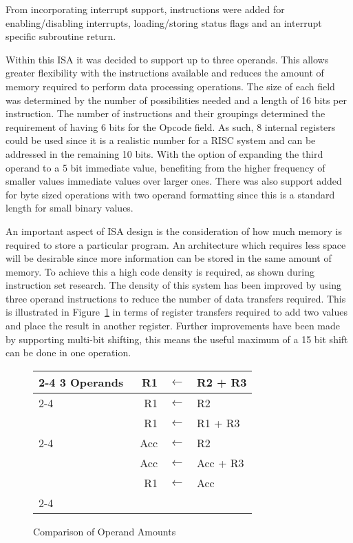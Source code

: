 From incorporating interrupt support, instructions were added for enabling/disabling interrupts, loading/storing status flags and an interrupt specific subroutine return.


Within this ISA it was decided to support up to three operands. 
This allows greater flexibility with the instructions available and reduces the amount of memory required to perform data processing operations. 
The size of each field was determined by the number of possibilities needed and a length of 16 bits per instruction.
The number of instructions and their groupings determined the requirement of having 6 bits for the Opcode field. 
As such, 8 internal registers could be used since it is a realistic number for a RISC system and can be addressed in the remaining 10 bits. 
With the option of expanding the third operand to a 5 bit immediate value, benefiting from the higher frequency of smaller values immediate values over larger ones. 
There was also support added for byte sized operations with two operand formatting since this is a standard length for small binary values. 

An important aspect of ISA design is the consideration of how much memory is required to store a particular program. 
An architecture which requires less space will be desirable since more information can be stored in the same amount of memory. 
To achieve this a high code density is required, as shown during instruction set research.
The density of this system has been improved by using three operand instructions to reduce the number of data transfers required. 
This is illustrated in Figure~\ref{fig:NoOperands} in terms of register transfers required to add two values and place the result in another register. 
Further improvements have been made by supporting multi-bit shifting, this means the useful maximum of a 15 bit shift can be done in one operation.

\begin{figure}[h]
\setlength{\tabcolsep}{2pt}
\centering
\footnotesize
\begin{tabular}{l|rcl|}
	\cline{2-4}
	3 Operands & R1 & $\leftarrow$ & R2 + R3 \\
	\cline{2-4}
	\multirow{2}{*}{2 Operands} & R1 & $\leftarrow$ & R2 \\
	 & R1 & $\leftarrow$ & R1 + R3 \\
	\cline{2-4}
	\multirow{3}{*}{1 Operand} & Acc & $\leftarrow$ & R2 \\
	 & ~Acc & $\leftarrow$ & Acc + R3 \hspace{0.5cm} \\
	 & R1 & $\leftarrow$ & Acc \\
	\cline{2-4}
\end{tabular}
\caption{Comparison of Operand Amounts}
\label{fig:NoOperands}
\end{figure}

